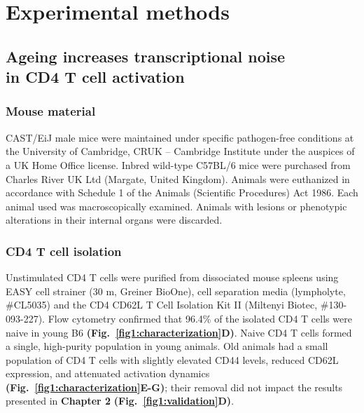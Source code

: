 
\chapter{Experimental methods} 

\section{Ageing increases transcriptional noise \\
in CD4\plus{} T cell activation}
\label{appA.1}

\subsection{Mouse material}

CAST/EiJ male mice were maintained under specific pathogen-free conditions at the University of Cambridge, CRUK – Cambridge Institute under the auspices of a UK Home Office license. 
Inbred wild-type C57BL/6 mice were purchased from Charles River UK Ltd (Margate, United Kingdom). 
Animals were euthanized in accordance with Schedule 1 of the Animals (Scientific Procedures) Act 1986. 
Each animal used was macroscopically examined. 
Animals with lesions or phenotypic alterations in their internal organs were discarded. 

\subsection{CD4\plus{} T cell isolation}
\label{appA.1:isolation}

Unstimulated CD4\plus{} T cells were purified from dissociated mouse spleens using EASY cell strainer (30 \textmu{}m, Greiner BioOne), cell separation media (lympholyte, \#{}CL5035) and the CD4\plus{} CD62L\plus{} T Cell Isolation Kit II (Miltenyi Biotec, \#{}130-093-227). 
Flow cytometry confirmed that 96.4\% of the isolated CD4\plus{} T cells were naive in young B6 \textbf{(Fig.~\ref{fig1:characterization}D)}. 
Naive CD4\plus{} T cells formed a single, high-purity population in young animals. Old animals had a small population of CD4\plus{} T cells with slightly elevated CD44 levels, reduced CD62L expression, and attenuated activation dynamics \textbf{(Fig.~\ref{fig1:characterization}E-G)}; 
their removal did not impact the results presented in \textbf{Chapter 2} \textbf{(Fig.~\ref{fig1:validation}D)}.\\


